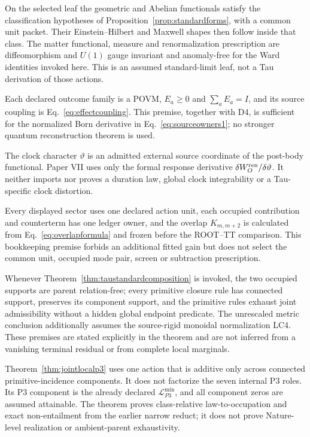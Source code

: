\documentclass[11pt]{article}
\begin{document}
\begin{description}[style=nextline,leftmargin=0pt]
\item[\textbf{D5: standard Lorentzian leaf.}]
On the selected leaf the geometric and Abelian functionals satisfy the
classification hypotheses of Proposition~\ref{prop:standardforms}, with a
common unit packet.  Their Einstein--Hilbert and Maxwell shapes then follow
inside that class.  The matter functional, measure and renormalization
prescription are diffeomorphism and $U(1)$ gauge invariant and anomaly-free
for the Ward identities invoked here.  This is an assumed standard-limit
leaf, not a Tau derivation of those actions.

\item[\textbf{D6: operational effect source.}]
Each declared outcome family is a POVM, $E_a\geq0$ and $\sum_aE_a=I$, and its
source coupling is Eq.~\eqref{eq:effectcoupling}.  This premise, together with
D4, is sufficient for the normalized Born derivative in
Eq.~\eqref{eq:sourceowners1}; no stronger quantum reconstruction theorem is
used.

\item[\textbf{D7: clock-source boundary.}]
The clock character $\vartheta$ is an admitted external source coordinate of
the post-body functional.  Paper VII uses only the formal response derivative
$\delta W_O^{\rm ren}/\delta\vartheta$.  It neither imports nor proves a
duration law, global clock integrability or a Tau-specific clock distortion.

\item[\textbf{D8: once-counted calibration.}]
Every displayed sector uses one declared action unit, each occupied
contribution and counterterm has one ledger owner, and the overlap
$K_{m,m+2}$ is calculated from Eq.~\eqref{eq:overlapformula} and frozen before
the ROOT--TT comparison.  This bookkeeping premise forbids an additional
fitted gain but does not select the common unit, occupied mode pair, screen or
subtraction prescription.

\item[\textbf{D9: component-local closure scope.}]
Whenever Theorem~\ref{thm:taustandardcomposition} is invoked, the two
occupied supports are parent relation-free; every primitive closure rule has
connected support, preserves its component support, and the primitive rules
exhaust joint admissibility without a hidden global endpoint predicate.  The
unrescaled metric conclusion additionally assumes the source-rigid monoidal
normalization LC4.  These premises are stated explicitly in the theorem and
are not inferred from a vanishing terminal residual or from complete local
marginals.

\item[\textbf{D10: joint locality/P3 completion scope.}]
Theorem~\ref{thm:jointlocalp3} uses one action that is additive only across
connected primitive-incidence components.  It does not factorize the seven
internal P3 roles.  Its P3 component is the already declared
$\mathcal L_{P3}^{\min}$, and all component zeros are assumed attainable.
The theorem proves class-relative law-to-occupation and exact non-entailment
from the earlier narrow reduct; it does not prove Nature-level realization or
ambient-parent exhaustivity.
\end{description}
\end{document}
